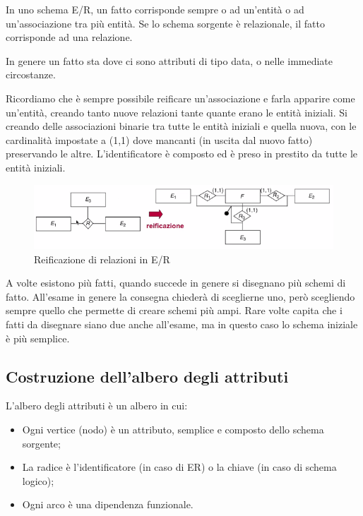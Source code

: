 In uno schema E/R, un fatto corrisponde sempre o ad un'entità o ad un'associazione tra più entità. Se lo schema sorgente è relazionale, il fatto corrisponde ad una relazione.

\begin{warn}
	In genere un fatto sta dove ci sono attributi di tipo data, o nelle immediate circostanze.
\end{warn}

Ricordiamo che è sempre possibile reificare un'associazione e farla apparire come un'entità, creando tanto nuove relazioni tante quante erano le entità iniziali. Si creando delle associazioni binarie tra tutte le entità iniziali e quella nuova, con le cardinalità impostate a (1,1) dove mancanti (in uscita dal nuovo fatto) preservando le altre. L'identificatore è composto ed è preso in prestito da tutte le entità iniziali.
\begin{figure}[H]
	\begin{center}
		\includegraphics[width=0.6\linewidth]{img/reif.PNG}
		\caption{Reificazione di relazioni in E/R}
	\end{center}
\end{figure}
\noindent A volte esistono più fatti, quando succede in genere si disegnano più schemi di fatto. All'esame in genere la consegna chiederà di sceglierne uno, però scegliendo sempre quello che permette di creare schemi più ampi. Rare volte capita che i fatti da disegnare siano due anche all'esame, ma in questo caso lo schema iniziale è più semplice.

\subsection{Costruzione dell'albero degli attributi}
L'albero degli attributi è un albero in cui:
\begin{itemize}
	\item Ogni vertice (nodo) è un attributo, semplice e composto dello schema sorgente;
	\item La radice è l'identificatore (in caso di ER) o la chiave (in caso di schema logico);
	\item Ogni arco è una dipendenza funzionale.
\end{itemize}

